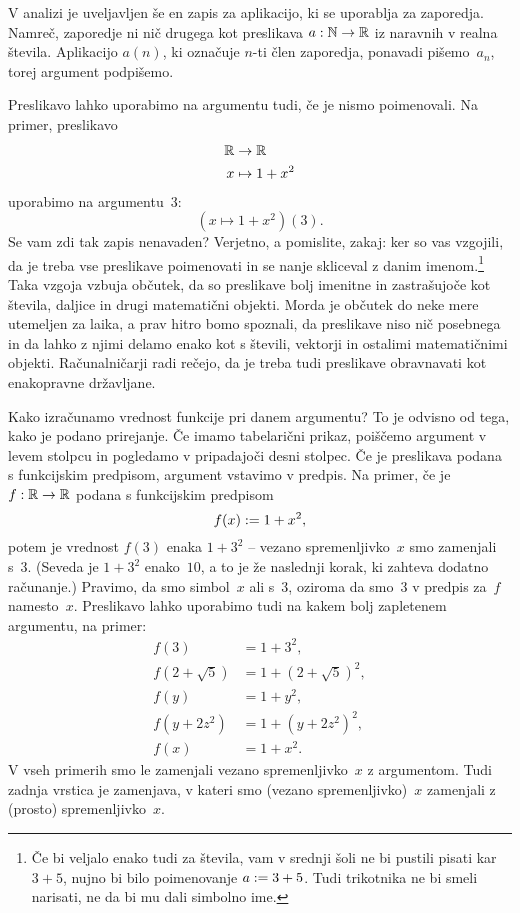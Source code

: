 V analizi je uveljavljen še en zapis za aplikacijo, ki se uporablja za zaporedja. Namreč,
zaporedje ni nič drugega kot preslikava $a : \mathbb{N} \to \mathbb{R}$ iz naravnih v realna števila.
Aplikacijo $a(n)$, ki označuje $n$-ti člen zaporedja, ponavadi pišemo~$a_n$, torej
argument podpišemo.

Preslikavo lahko uporabimo na argumentu tudi, če je nismo poimenovali. Na primer,
preslikavo
%
\begin{align*}
  \mathbb{R} &\to \mathbb{R} \\
  x &\mapsto 1 + x^2
\end{align*}
%
uporabimo na argumentu~$3$:
%
\begin{equation*}
  (x \mapsto 1 + x^2)(3).
\end{equation*}
%
Se vam zdi tak zapis nenavaden? Verjetno, a pomislite, zakaj: ker so vas vzgojili, da
je treba vse preslikave poimenovati in se nanje skliceval z danim imenom.\footnote{Če bi veljalo enako tudi za števila, vam v srednji šoli ne bi pustili pisati kar $3 + 5$, nujno bi bilo poimenovanje $a \mathrel{{:}{=}} 3 + 5$. Tudi trikotnika ne bi smeli narisati, ne da bi mu dali simbolno ime.}
%
Taka vzgoja vzbuja občutek, da so preslikave bolj imenitne in zastrašujoče kot števila, daljice in drugi matematični objekti. Morda je občutek do neke mere utemeljen za laika, a prav hitro bomo spoznali, da preslikave niso nič
posebnega in da lahko z njimi delamo enako kot s števili, vektorji in ostalimi matematičnimi objekti. Računalničarji radi rečejo, da je treba tudi preslikave obravnavati kot enakopravne državljane.

Kako izračunamo vrednost funkcije pri danem argumentu? To je odvisno od tega,
kako je podano prirejanje. Če imamo tabelarični prikaz, poiščemo argument v levem stolpcu
in pogledamo v pripadajoči desni stolpec. Če je preslikava podana s funkcijskim predpisom, argument
vstavimo v predpis. Na primer, če je $f : \mathbb{R} \to \mathbb{R}$ podana s funkcijskim predpisom
%
\begin{equation*}
  f(x) \mathrel{{:}{=}} 1 + x^2,
\end{equation*}
%
potem je vrednost $f(3)$ enaka $1 + 3^2$ -- vezano spremenljivko~$x$ smo zamenjali s~$3$. (Seveda je $1 + 3^2$ enako~$10$, a to je že naslednji korak, ki zahteva dodatno računanje.)
Pravimo, da smo simbol~$x$  ali
 s~$3$, oziroma da smo~$3$  v predpis za~$f$ namesto~$x$. 
%
Preslikavo lahko uporabimo tudi na kakem bolj zapletenem argumentu, na primer:
%
\begin{align*}
  f(3) &= 1 + 3^2, \\
  f(2 + \sqrt{5}) &= 1 + (2 + \sqrt{5})^2, \\
  f(y) &= 1 + y^2, \\
  f(y + 2 z^2) &= 1 + (y + 2 z^2)^2, \\
  f(x) &= 1 + x^2.
\end{align*}
%
V vseh primerih smo le zamenjali vezano spremenljivko~$x$ z argumentom.
%
Tudi zadnja vrstica je zamenjava, v kateri smo (vezano spremenljivko)~$x$ zamenjali z (prosto) spremenljivko~$x$.

